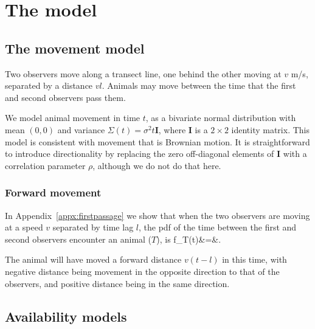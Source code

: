 \documentclass[useAMS, usenatbib, referee]{biom}\usepackage[]{graphicx}\usepackage[]{color}
\begin{document}
\section{The model\label{sec:genmod}}


\subsection{The movement model}

Two observers move along a transect line, one behind the other moving at $v$ m/s, separated by a distance $vl$. Animals may move between the time that the first and second observers pass them. 

We model animal movement in time $t$, as a bivariate normal distribution with mean $(0,0)$ and variance $\Sigma(t)=\sigma^2t\bm{I}$, where $\bm{I}$ is a $2\times 2$ identity matrix. This model is consistent with movement that is Brownian motion. It is straightforward to introduce directionality by replacing the zero off-diagonal elements of $\bm{I}$ with a correlation parameter $\rho$, although we do not do that here.

\subsubsection{Forward movement}

In Appendix~\ref{appx:firstpassage} we show that when the two observers are moving at a speed $v$ separated by time lag $l$, the pdf of the time between the first and second observers encounter an animal ($T$), is 
\be
f_{T}(t)&=&.
\ee

The animal will have moved a forward distance $v(t-l)$ in this time, with negative distance being movement in the opposite direction to that of the observers, and positive distance being in the same direction.



\subsection{Availability models}
\end{document}
